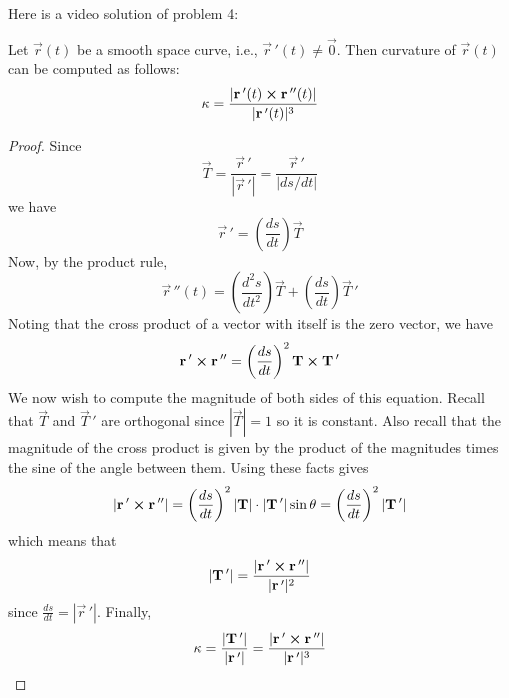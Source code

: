 \documentclass[handout]{ximera}
\begin{document}
Here is a video solution of problem 4:\\
\begin{foldable}
\end{foldable}

\begin{proposition}
Let $\vec r(t)$ be a smooth space curve, i.e., $\vec r\,'(t) \neq \vec 0$. Then curvature of $\vec r(t)$ can be computed as follows:
\[
\kappa = \frac{|\mathbf r\,'(t) \boldsymbol\times \mathbf r\,''(t)|}{|\mathbf r\,'(t)|^3}
\]
\end{proposition}


\begin{proof}
Since
\[
\vec T = \frac{\vec r\,'}{|\vec r\, '|} = \frac{\vec r\,'}{|ds/dt|}
\]
we have
\[
\vec r\,' = \left(\frac{ds}{dt}\right) \vec T
\]
Now, by the product rule,
\[
 \vec r\,''(t) = \left(\frac{d^2s}{dt^2}\right) \vec T + \left(\frac{ds}{dt}\right) \vec T\,'
\]
Noting that the cross product of a vector with itself is the zero vector, we have
\[
\mathbf r\,' \boldsymbol\times \mathbf r\,'' = \left(\frac{ds}{dt}\right)^2 \mathbf T \boldsymbol\times \mathbf T\,'
\]
We now wish to compute the magnitude of both sides of this equation.
Recall that $\vec T$ and $\vec T\,'$ are orthogonal since $|\vec T| = 1$ so it is constant. Also recall that the 
magnitude of the cross product is given by the product of the magnitudes times the sine of the angle between them. 
Using these facts gives
\[
|\mathbf r\,' \boldsymbol\times \mathbf r\,''| = \left(\frac{ds}{dt}\right)^2 | \mathbf T|\cdot | \mathbf T\,'|\sin \theta =\left(\frac{ds}{dt}\right)^2 | \mathbf T\,'|
\]
which means that
\[
| \mathbf T\,'| = \frac{|\mathbf r\,' \boldsymbol\times \mathbf r\,''|}{|\mathbf r\,'|^2}
\]
since $\frac{ds}{dt} = |\vec r\,'|$.
Finally,
\[
\kappa = \frac{| \mathbf T\,'|}{|\mathbf r\,'|} = \frac{|\mathbf r\,' \boldsymbol\times \mathbf r\,''|}{|\mathbf r\,'|^3}
\]
\end{proof}
\end{document}
